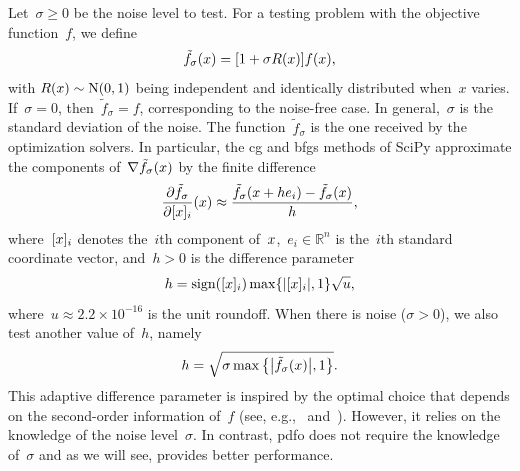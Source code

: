 \documentclass[smallextended,final]{svjour3}
\DeclareMathOperator{\sgn}{sign}
\newcommand{\abs}[2][]{#1\lvert#2#1\rvert}
\newcommand{\set}[2][]{#1\{#2#1\}}
\newcommand{\NN}{\mathrm{N}}
\newcommand{\R}{\mathbb{R}}
\newcommand{\iter}[1][k]{x\ifthenelse{\equal{#1}{}}{}{_{#1}}}
\newcommand{\obj}{f}
\newcommand{\modified}[1]{\texorpdfstring{{\color{RoyalBlue}#1}}{#1}}
\begin{document}
Let~$\sigma \ge 0$ be the noise level to test.
For a testing problem with the objective function~$\obj$, we define
\begin{equation}
    \label{eq:noisy-obj}
    \tilde{\obj}_\sigma(\iter[]) = [1 + \sigma R(\iter[])] \obj(\iter[]),
\end{equation}
with $R(\iter[])\sim \NN(0, 1)$ being independent and identically distributed when~$x$ varies.
If~$\sigma = 0$, then~$\tilde{f}_\sigma = f$, corresponding to the noise-free case.
In general,~$\sigma$ \modified{is} the standard deviation of the noise.
\modified{
    The function~$\tilde{\obj}_\sigma$ is the one received by the optimization solvers.
    In particular, the \gls{cg} and \gls{bfgs} methods of SciPy approximate the components of~$\nabla \tilde{\obj}_\sigma(\iter[])$ by the finite difference
    \begin{equation*}
        \frac{\partial \tilde{\obj}_\sigma}{\partial [{\iter[]}]_i}(\iter[]) \approx \frac{\tilde{\obj}_\sigma(\iter[] + h e_i) - \tilde{\obj}_\sigma(\iter[])}{h},
    \end{equation*}
    where~$[{\iter[]}]_i$ denotes the~$i$th component of~$\iter[]$,~$e_i \in \R^n$ is the~$i$th standard coordinate vector, and~$h > 0$ is the difference parameter
    \begin{equation}
        \label{eq:scipy-h}
        h = \sgn([{\iter[]}]_i) \max \set{\abs{[{\iter[]}]_i}, 1} \sqrt{u},
    \end{equation}
    where~$u \approx 2.2 \times 10^{-16}$ is the unit roundoff.
    When there is noise ($\sigma > 0$), we also test another value of~$h$, namely
    \begin{equation}
        \label{eq:adaptive-h}
        h = \sqrt{\sigma \max \set[\big]{\abs[\big]{\tilde{\obj}_\sigma(\iter[])}, 1}}.
    \end{equation}
    This adaptive difference parameter is inspired by the optimal choice that depends on the second-order information of~$\obj$ (see, e.g.,~\cite{More_Wild_2012} and~\cite[Equation~(2.2)]{Shi_Etal_2022a}).
    However, it relies on the knowledge of the noise level~$\sigma$.
    In contrast, \gls{pdfo} does not require the knowledge of~$\sigma$ and as we will see, provides better performance.
}
\end{document}
